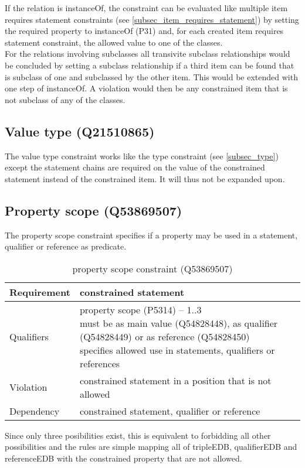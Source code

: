 \documentclass[hyperref,bachelorofscience]{cgvpub}
\begin{document}
If the relation is instanceOf, the constraint can be evaluated like multiple item requires statement constraints (see \ref{subsec_item_requires_statement}) by setting the required property to instanceOf (P31) and, for each created item requires statement constraint, the allowed value to one of the classes. \\
For the relations involving subclasses all transivite subclass relationships would be concluded by setting a subclass relationship if a third item can be found that is subclass of one and subclassed by the other item. This would be extended with one step of instanceOf. A violation would then be any constrained item that is not subclass of any of the classes.

\subsection{Value type (Q21510865)}
The value type constraint works like the type constraint (see \ref{subsec_type}) except the statement chains are required on the value of the constrained statement instead of the constrained item. It will thus not be expanded upon.

\subsection{Property scope (Q53869507)}
The property scope constraint specifies if a property may be used in a statement, qualifier or reference as predicate.
\begin{table}[H]
\caption{property scope constraint (Q53869507)}
\begin{tabularx}{\textwidth}{ ll X}
\hline
Requirement & constrained statement \\
\hline
Qualifiers & \makecell{property scope (P5314) -- 1..3 \\ must be as main value (Q54828448), as qualifier (Q54828449) or as reference (Q54828450) \\ specifies allowed use in statements, qualifiers or references} \\
\hline
Violation & constrained statement in a position that is not allowed \\
\hline
Dependency & constrained statement, qualifier or reference \\
\hline
\end{tabularx}
\end{table}

Since only three posibilities exist, this is equivalent to forbidding all other possibilities and the rules are simple mapping all of tripleEDB, qualifierEDB and referenceEDB with the constrained property that are not allowed.
\end{document}
